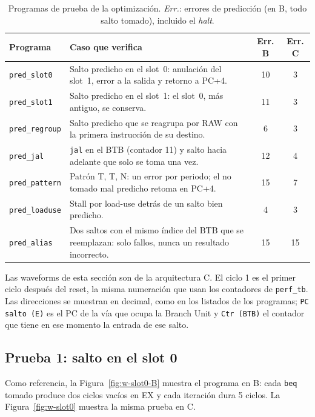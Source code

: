 \documentclass[12pt,a4paper]{article}
\newcommand{\sig}[1]{\texttt{#1}}
\begin{document}
\begin{table}[H]
\centering
\small
\begin{tabularx}{\linewidth}{lXcc}
\toprule
\textbf{Programa} & \textbf{Caso que verifica} & \textbf{Err. B} & \textbf{Err. C} \\
\midrule
\texttt{pred\_slot0} & Salto predicho en el slot~0: anulación del slot~1, error a la salida y retorno a PC+4. & 10 & 3 \\
\texttt{pred\_slot1} & Salto predicho en el slot~1: el slot~0, más antiguo, se conserva. & 11 & 3 \\
\texttt{pred\_regroup} & Salto predicho que se reagrupa por RAW con la primera instrucción de su destino. & 6 & 3 \\
\texttt{pred\_jal} & \texttt{jal} en el BTB (contador 11) y salto hacia adelante que solo se toma una vez. & 12 & 4 \\
\texttt{pred\_pattern} & Patrón T, T, N: un error por periodo; el no tomado mal predicho retoma en PC+4. & 15 & 7 \\
\texttt{pred\_loaduse} & Stall por load-use detrás de un salto bien predicho. & 4 & 3 \\
\texttt{pred\_alias} & Dos saltos con el mismo índice del BTB que se reemplazan: solo fallos, nunca un resultado incorrecto. & 15 & 15 \\
\bottomrule
\end{tabularx}
\caption{Programas de prueba de la optimización. \textit{Err.}: errores de predicción (en B, todo salto tomado), incluido el \textit{halt}.}
\label{tab:opt-tests}
\end{table}

\noindent Las waveforms de esta sección son de la arquitectura C. El ciclo 1 es el primer ciclo después del reset, la misma numeración que usan los contadores de \texttt{perf\_tb}. Las direcciones se muestran en decimal, como en los listados de los programas; \sig{PC salto (E)} es el PC de la vía que ocupa la Branch Unit y \sig{Ctr (BTB)} el contador que tiene en ese momento la entrada de ese salto.

\subsection{Prueba 1: salto en el slot 0}


Como referencia, la Figura~\ref{fig:w-slot0-B} muestra el programa en B: cada \texttt{beq} tomado produce dos ciclos vacíos en EX y cada iteración dura 5 ciclos. La Figura~\ref{fig:w-slot0} muestra la misma prueba en C.
\end{document}
